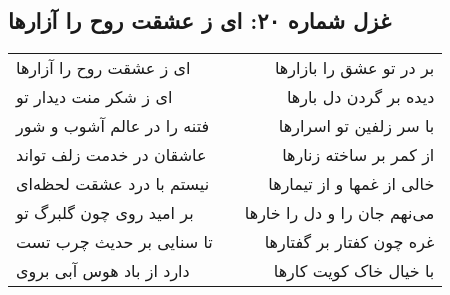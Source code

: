 \begin{center}
\section*{غزل شماره ۲۰: ای ز عشقت روح را آزارها}
\label{sec:020}
\begin{longtable}{l p{0.5cm} r}
ای ز عشقت روح را آزارها
&&
بر در تو عشق را بازارها
\\
ای ز شکر منت دیدار تو
&&
دیده بر گردن دل بارها
\\
فتنه را در عالم آشوب و شور
&&
با سر زلفین تو اسرارها
\\
عاشقان در خدمت زلف تواند
&&
از کمر بر ساخته زنارها
\\
نیستم با درد عشقت لحظه‌ای
&&
خالی از غمها و از تیمارها
\\
بر امید روی چون گلبرگ تو
&&
می‌نهم جان را و دل را خارها
\\
تا سنایی بر حدیث چرب تست
&&
غره چون کفتار بر گفتارها
\\
دارد از باد هوس آبی بروی
&&
با خیال خاک کویت کارها
\\
\end{longtable}
\end{center}
